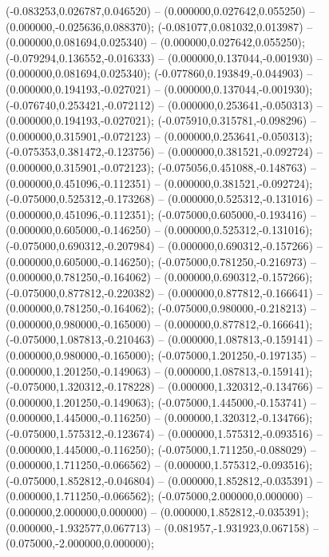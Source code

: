  (-0.083253,0.026787,0.046520) -- (0.000000,0.027642,0.055250) -- (0.000000,-0.025636,0.088370);
 (-0.081077,0.081032,0.013987) -- (0.000000,0.081694,0.025340) -- (0.000000,0.027642,0.055250);
 (-0.079294,0.136552,-0.016333) -- (0.000000,0.137044,-0.001930) -- (0.000000,0.081694,0.025340);
 (-0.077860,0.193849,-0.044903) -- (0.000000,0.194193,-0.027021) -- (0.000000,0.137044,-0.001930);
 (-0.076740,0.253421,-0.072112) -- (0.000000,0.253641,-0.050313) -- (0.000000,0.194193,-0.027021);
 (-0.075910,0.315781,-0.098296) -- (0.000000,0.315901,-0.072123) -- (0.000000,0.253641,-0.050313);
 (-0.075353,0.381472,-0.123756) -- (0.000000,0.381521,-0.092724) -- (0.000000,0.315901,-0.072123);
 (-0.075056,0.451088,-0.148763) -- (0.000000,0.451096,-0.112351) -- (0.000000,0.381521,-0.092724);
 (-0.075000,0.525312,-0.173268) -- (0.000000,0.525312,-0.131016) -- (0.000000,0.451096,-0.112351);
 (-0.075000,0.605000,-0.193416) -- (0.000000,0.605000,-0.146250) -- (0.000000,0.525312,-0.131016);
 (-0.075000,0.690312,-0.207984) -- (0.000000,0.690312,-0.157266) -- (0.000000,0.605000,-0.146250);
 (-0.075000,0.781250,-0.216973) -- (0.000000,0.781250,-0.164062) -- (0.000000,0.690312,-0.157266);
 (-0.075000,0.877812,-0.220382) -- (0.000000,0.877812,-0.166641) -- (0.000000,0.781250,-0.164062);
 (-0.075000,0.980000,-0.218213) -- (0.000000,0.980000,-0.165000) -- (0.000000,0.877812,-0.166641);
 (-0.075000,1.087813,-0.210463) -- (0.000000,1.087813,-0.159141) -- (0.000000,0.980000,-0.165000);
 (-0.075000,1.201250,-0.197135) -- (0.000000,1.201250,-0.149063) -- (0.000000,1.087813,-0.159141);
 (-0.075000,1.320312,-0.178228) -- (0.000000,1.320312,-0.134766) -- (0.000000,1.201250,-0.149063);
 (-0.075000,1.445000,-0.153741) -- (0.000000,1.445000,-0.116250) -- (0.000000,1.320312,-0.134766);
 (-0.075000,1.575312,-0.123674) -- (0.000000,1.575312,-0.093516) -- (0.000000,1.445000,-0.116250);
 (-0.075000,1.711250,-0.088029) -- (0.000000,1.711250,-0.066562) -- (0.000000,1.575312,-0.093516);
 (-0.075000,1.852812,-0.046804) -- (0.000000,1.852812,-0.035391) -- (0.000000,1.711250,-0.066562);
 (-0.075000,2.000000,0.000000) -- (0.000000,2.000000,0.000000) -- (0.000000,1.852812,-0.035391);
 (0.000000,-1.932577,0.067713) -- (0.081957,-1.931923,0.067158) -- (0.075000,-2.000000,0.000000);
